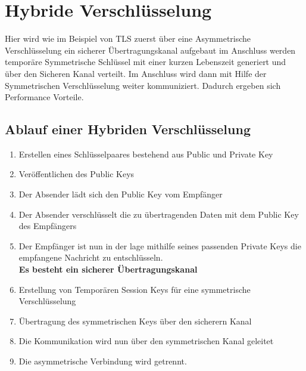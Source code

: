 
\chapter{Hybride Verschlüsselung} %



Hier wird wie im Beispiel von TLS zuerst über eine Asymmetrische Verschlüsselung ein sicherer Übertragungskanal aufgebaut im Anschluss werden temporäre Symmetrische Schlüssel mit einer kurzen Lebenszeit generiert und über den Sicheren Kanal verteilt. Im Anschluss wird dann mit Hilfe der Symmetrischen Verschlüsselung weiter kommuniziert. Dadurch ergeben sich Performance Vorteile.

\section{Ablauf einer Hybriden Verschlüsselung}
\begin{enumerate}
    \item Erstellen eines Schlüsselpaares bestehend aus Public und Private Key
    \item Veröffentlichen des Public Keys
    \item Der Absender lädt sich den Public Key vom Empfänger
    \item Der Absender verschlüsselt die zu übertragenden Daten mit dem Public Key des Empfängers
    \item Der Empfänger ist nun in der lage mithilfe seines passenden Private Keys die empfangene Nachricht zu entschlüsseln.
    \\\textbf{Es besteht ein sicherer Übertragungskanal}
    \item Erstellung von Temporären Session Keys für eine symmetrische Verschlüsselung
    \item Übertragung des symmetrischen Keys über den sicherern Kanal
    \item Die Kommunikation wird nun über den symmetrischen Kanal geleitet
    \item Die asymmetrische Verbindung wird getrennt.
\end{enumerate}